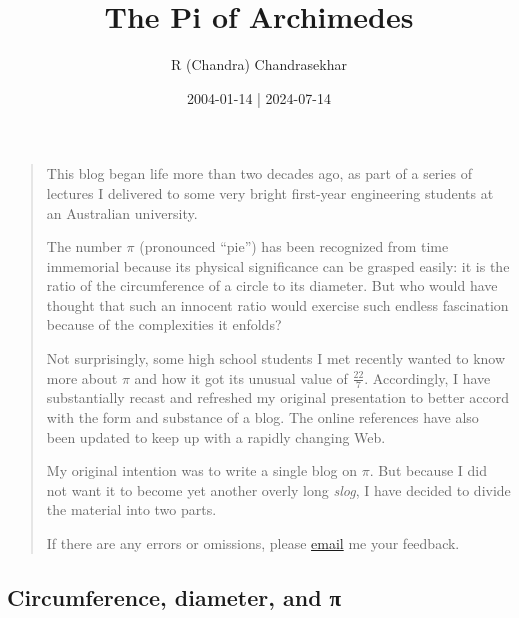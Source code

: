 \documentclass[
  a4paper,
]{article}
\title{The Pi of Archimedes}
\author{R (Chandra) Chandrasekhar}
\date{2004-01-14 | 2024-07-14}
\begin{document}
\maketitle

\thispagestyle{empty}


\begin{quote}
This blog began life more than two decades ago, as part of a series of
lectures I delivered to some very bright first-year engineering students
at an Australian university.

The number \(\pi\) (pronounced ``pie'') has been recognized from time
immemorial because its physical significance can be grasped easily: it
is the ratio of the circumference of a circle to its diameter. But who
would have thought that such an innocent ratio would exercise such
endless fascination because of the complexities it enfolds?

Not surprisingly, some high school students I met recently wanted to
know more about \(\pi\) and how it got its unusual value of
\(\frac{22}{7}\). Accordingly, I have substantially recast and refreshed
my original presentation to better accord with the form and substance of
a blog. The online references have also been updated to keep up with a
rapidly changing Web.

My original intention was to write a single blog on \(\pi\). But because
I did not want it to become yet another overly long \emph{slog}, I have
decided to divide the material into two parts.

If there are any errors or omissions, please
\href{mailto:feedback.swanlotus@gmail.com}{email} me your feedback.
\end{quote}

\subsection{Circumference, diameter, and
π}\label{circumference-diameter-and-ux3c0}
\end{document}
